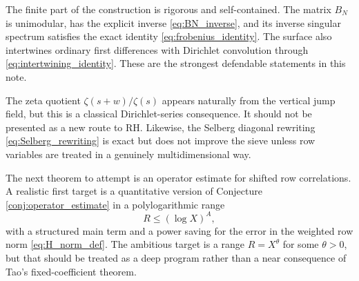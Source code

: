 \documentclass[11pt]{amsart}
\numberwithin{equation}{section}
\theoremstyle{plain}
\theoremstyle{definition}
\theoremstyle{remark}
\newcommand{\zetaR}{\zeta}
\begin{document}
The finite part of the construction is rigorous and self-contained.  The matrix \(B_N\) is unimodular, has the explicit inverse \eqref{eq:BN_inverse}, and its inverse singular spectrum satisfies the exact identity \eqref{eq:frobenius_identity}.  The surface also intertwines ordinary first differences with Dirichlet convolution through \eqref{eq:intertwining_identity}.  These are the strongest defendable statements in this note.

The zeta quotient \(\zetaR(s+w)/\zetaR(s)\) appears naturally from the vertical jump field, but this is a classical Dirichlet-series consequence.  It should not be presented as a new route to RH.  Likewise, the Selberg diagonal rewriting \eqref{eq:Selberg_rewriting} is exact but does not improve the sieve unless row variables are treated in a genuinely multidimensional way.

The next theorem to attempt is an operator estimate for shifted row correlations.  A realistic first target is a quantitative version of Conjecture \ref{conj:operator_estimate} in a polylogarithmic range
\begin{equation}
R\le(\log X)^A,
\label{eq:next_polylog_range}
\end{equation}
with a structured main term and a power saving for the error in the weighted row norm \eqref{eq:H_norm_def}.  The ambitious target is a range \(R=X^\theta\) for some \(\theta>0\), but that should be treated as a deep program rather than a near consequence of Tao's fixed-coefficient theorem.
\end{document}
